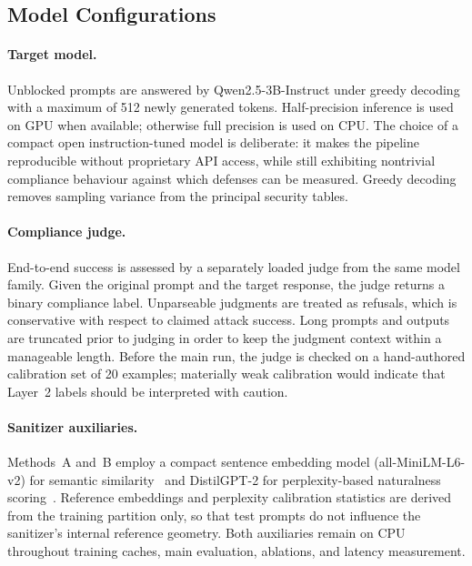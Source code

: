 ﻿\documentclass[10pt]{article}
\begin{document}
\subsection{Model Configurations}
\label{sec:models-setup}

\paragraph{Target model.}
Unblocked prompts are answered by Qwen2.5-3B-Instruct under greedy decoding with a maximum of 512 newly generated tokens.
Half-precision inference is used on GPU when available; otherwise full precision is used on CPU.
The choice of a compact open instruction-tuned model is deliberate: it makes the pipeline reproducible without proprietary API access, while still exhibiting nontrivial compliance behaviour against which defenses can be measured.
Greedy decoding removes sampling variance from the principal security tables.

\paragraph{Compliance judge.}
End-to-end success is assessed by a separately loaded judge from the same model family.
Given the original prompt and the target response, the judge returns a binary compliance label.
Unparseable judgments are treated as refusals, which is conservative with respect to claimed attack success.
Long prompts and outputs are truncated prior to judging in order to keep the judgment context within a manageable length.
Before the main run, the judge is checked on a hand-authored calibration set of 20 examples; materially weak calibration would indicate that Layer~2 labels should be interpreted with caution.

\paragraph{Sanitizer auxiliaries.}
Methods~A and~B employ a compact sentence embedding model (all-MiniLM-L6-v2) for semantic similarity~\cite{reimers2019sentence,wang2020minilm} and DistilGPT-2 for perplexity-based naturalness scoring~\cite{radford2019language}.
Reference embeddings and perplexity calibration statistics are derived from the training partition only, so that test prompts do not influence the sanitizer's internal reference geometry.
Both auxiliaries remain on CPU throughout training caches, main evaluation, ablations, and latency measurement.
\end{document}
